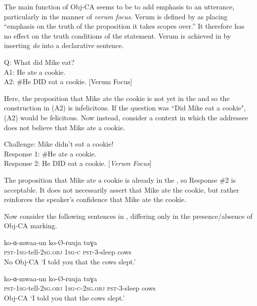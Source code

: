 \documentclass[output=paper,newtxmath,modfonts,nonflat,hidelinks]{langsci/langscibook}
\begin{document}
The main function of Obj-CA seems to be to add emphasis to an utterance, particularly in the manner of \textit{verum focus}. Verum  is defined by \citet{Hohle:1992} as placing ``emphasis on the truth of the proposition it takes scopes over.'' It therefore has no effect on the truth conditions of the statement. Verum  is achieved in  by inserting \textit{do} into a declarative sentence. 

\ea \label{No-VF English}
Q: What did Mike eat? \\
A1: He ate a cookie. \\
A2: \#He DID eat a cookie. \hfill [Verum Focus]
\z

\noindent Here, the proposition that Mike ate the cookie is not yet in the  and so the  construction in (A2) is infelicitous. If the question was ``Did Mike eat a cookie", (A2) would be felicitous. Now instead, consider a context in which the addressee does not believe that Mike ate a cookie.

\ea \label{VF English}
Challenge: Mike didn't eat a cookie! \\
Response 1: \#He ate a cookie. \\
Response 2: He DID eat a cookie. \hfill [\textit{Verum Focus}]
\z

\noindent The proposition that Mike ate a cookie is already in the , so Response \#2 is acceptable. It does not necessarily assert that Mike ate the cookie, but rather reinforces the speaker's confidence that Mike ate the cookie.  

Now consider the following sentences in , differing only in the presence/absence of Obj-CA marking.

\ea \label{Obj-CA Contexts} 
\begin{xlist}

\ex \label{Obj-CA 1}
\gll ko-ɑ-mwaa-un  ko-\O-ɾuuja tuɣa \\
\textsc{pst}-1\textsc{sg}-tell-2\textsc{sg}.\textsc{obj} 1\textsc{sg-c} \textsc{pst}-3-sleep cows \\
\hfill  {No Obj-CA}
\glt `I told you that the cows slept.'
	
\ex \label{Obj-CA 2}
\gll ko-ɑ-mwaa-un  ko-\O-ɾuuja tuɣa \\
\textsc{pst}-1\textsc{sg}-tell-2\textsc{sg}.\textsc{obj} 1\textsc{sg-c-}2\textsc{sg}.\textsc{obj} \textsc{pst}-3-sleep cows \\
\hfill  {Obj-CA}
\glt `I told you that the cows slept.'

\end{xlist}
\z
\end{document}
